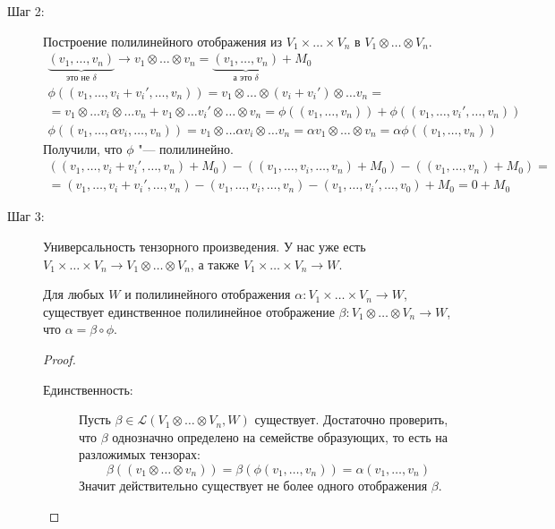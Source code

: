 \begin{description}
\item[Шаг 2:]
	Построение полилинейного отображения из $V_1 \times \dots \times V_n$ в $V_1 \otimes \dots \otimes V_n$.
	\begin{gather*}
		\underbrace{(v_1, \dots, v_n)}_{\text{это не $\delta$}} \to v_1 \otimes \dots \otimes v_n = \underbrace{(v_1, \dots, v_n)}_{\text{а это $\delta$}} + M_0 \\
		\phi((v_1, \dots, v_i + v_i', \dots, v_n))
		= v_1 \otimes \dots \otimes (v_i + v_i') \otimes \dots v_n = \\
		= v_1 \otimes \dots v_i \otimes \dots v_n + v_1 \otimes \dots v_i' \otimes \dots \otimes v_n
		= \phi ((v_1, \dots, v_n)) + \phi((v_1, \dots, v_i', \dots, v_n)) \\
		\phi((v_1, \dots, \alpha v_i, \dots, v_n))
		= v_1 \otimes \dots \alpha v_i \otimes \dots v_n
		= \alpha v_1 \otimes \dots \otimes v_n
		= \alpha \phi((v_1, \dots, v_n))
	\end{gather*}
	Получили, что $\phi$ "--- полилинейно.
	\begin{gather*}
		((v_1, \dots, v_i + v_i', \dots, v_n) + M_0) - ((v_1, \dots, v_i, \dots, v_n) + M_0) - ((v_1,\dots, v_n) + M_0) = \\
		= (v_1, \dots, v_i + v_i',  \dots, v_n) - (v_1, \dots, v_i, \dots, v_n) -  (v_1, \dots, v_i', \dots, v_0) + M_0 = 0 + M_0
	\end{gather*}

\item[Шаг 3:] Универсальность тензорного произведения.
	У нас уже есть $V_1 \times \dots \times V_n \to V_1 \otimes \dots \otimes V_n$, а также $V_1 \times \dots \times V_n \to W$.
	\begin{theorem}
		Для любых $W$ и полилинейного отображения $\alpha \colon V_1 \times \dots \times V_n \to W$,
		существует единственное полилинейное отображение $\beta \colon V_1 \otimes \dots \otimes V_n \to W$,
		что $\alpha = \beta \circ \phi$.
	\end{theorem}
	\begin{proof}\begin{description}
	\item[Единственность:]
		Пусть $\beta \in \mathscr{L}(V_1 \otimes \dots \otimes V_n, W)$  существует.
		Достаточно проверить, что $\beta$ однозначно определено на семействе образующих, то есть на разложимых тензорах:
		\[ \beta((v_1\otimes \dots \otimes v_n)) = \beta (\phi(v_1, \dots, v_n)) = \alpha (v_1, \dots, v_n) \]
		Значит действительно существует не более одного отображения $\beta$.


\end{description}
\end{proof}
\end{description}
